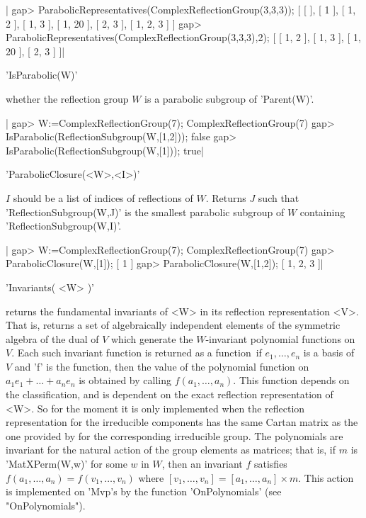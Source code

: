 |    gap> ParabolicRepresentatives(ComplexReflectionGroup(3,3,3));
    [ [  ], [ 1 ], [ 1, 2 ], [ 1, 3 ], [ 1, 20 ], [ 2, 3 ], [ 1, 2, 3 ] ]
    gap> ParabolicRepresentatives(ComplexReflectionGroup(3,3,3),2);
    [ [ 1, 2 ], [ 1, 3 ], [ 1, 20 ], [ 2, 3 ] ]|


'IsParabolic(W)'

whether the reflection group $W$ is a parabolic subgroup of 'Parent(W)'.

|    gap> W:=ComplexReflectionGroup(7);
    ComplexReflectionGroup(7)
    gap> IsParabolic(ReflectionSubgroup(W,[1,2]));
    false
    gap> IsParabolic(ReflectionSubgroup(W,[1]));
    true|


'ParabolicClosure(<W>,<I>)'

$I$  should be a  list of indices  of reflections of  $W$. Returns $J$ such
that  'ReflectionSubgroup(W,J)' is  the smallest  parabolic subgroup of $W$
containing 'ReflectionSubgroup(W,I)'.

|    gap> W:=ComplexReflectionGroup(7);
    ComplexReflectionGroup(7)
    gap> ParabolicClosure(W,[1]);
    [ 1 ]
    gap> ParabolicClosure(W,[1,2]);
    [ 1, 2, 3 ]|


'Invariants( <W> )'

returns  the fundamental invariants of <W> in its reflection representation
<V>.  That is, returns  a set of  algebraically independent elements of the
symmetric  algebra  of  the  dual  of  $V$ which generate the $W$-invariant
polynomial  functions on $V$. Each such invariant function is returned as a
{\GAP}  function\:\ if $e_1,\ldots,e_n$  is a basis  of $V$ and  'f' is the
{\GAP}   function,   then   the   value   of  the  polynomial  function  on
$a_1e_1+\ldots+a_n  e_n$ is  obtained by  calling $f(a_1,\ldots,a_n)$. This
function  depends  on  the  classification,  and  is dependent on the exact
reflection  representation of <W>. So for the moment it is only implemented
when  the reflection representation for  the irreducible components has the
same  Cartan matrix as the one  provided by {\CHEVIE} for the corresponding
irreducible  group. The polynomials are invariant for the natural action of
the group elements as matrices; that is, if $m$ is 'MatXPerm(W,w)' for some
$w$   in  $W$,   then  an   invariant  $f$   satisfies  $f(a_1,\ldots,a_n)=
f(v_1,\ldots,v_n)$  where $[v_1,\ldots,v_n]=[a_1,\ldots,a_n]\times m$. This
action  is  implemented  on  'Mvp's  by  the  function 'OnPolynomials' (see
"OnPolynomials").

